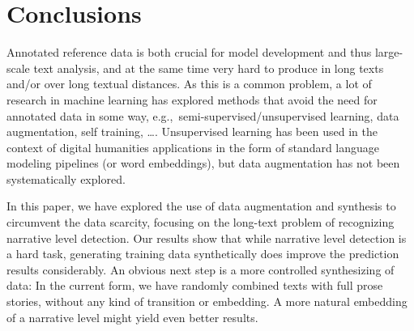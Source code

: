 \documentclass[10pt, a4paper]{article}
\newcommand{\sina}[1]{\textit{\textcolor{blue}{sina: #1}}}
\begin{document}








\section{Conclusions}
\label{sec:conclusions}

Annotated reference data is both crucial for model development and thus large-scale text analysis, and at the same time very hard to produce in long texts and/or over long textual distances. As this is a common problem, a lot of research in machine learning has explored methods that avoid the need for annotated data in some way, e.g.,~semi-supervised/unsupervised learning, data augmentation, self training, \dots. Unsupervised learning has been used in the context of digital humanities applications in the form of standard language modeling pipelines (or word embeddings), but data augmentation has not been systematically explored. 

In this paper, we have explored the use of data augmentation and synthesis to circumvent the data scarcity, focusing on the long-text problem of recognizing narrative level detection. Our results show that while narrative level detection is a hard task, generating training data synthetically does improve the prediction results considerably. An obvious next step is a more controlled synthesizing of data: In the current form, we have randomly combined texts with full prose stories, without any kind of transition or embedding. A more natural embedding of a narrative level might yield even better results.
\end{document}
